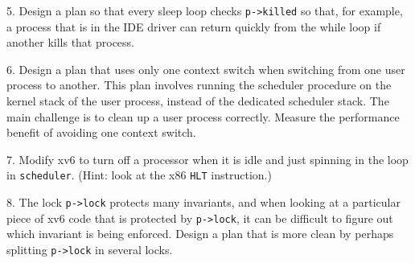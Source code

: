 5. Design a plan so that every sleep loop checks 
\lstinline{p->killed}
so that, for example, a process that is in the IDE driver can return quickly from the while loop
if another kills that process.

6. Design a plan that uses only one context switch when switching from one user
process to another.  This plan involves running the scheduler procedure on the
kernel stack of the user process, instead of the dedicated scheduler stack.  The
main challenge is to clean up a user process correctly.  Measure the performance
benefit of avoiding one context switch.

7. Modify xv6 to turn off a processor when it is idle and just spinning in the
loop in
\lstinline{scheduler}.
(Hint: look at the x86
\lstinline{HLT}
instruction.)

8. The lock
\lstinline{p->lock}
protects many invariants, and when looking at a particular piece of xv6 code that
is protected by
\lstinline{p->lock},
it can be difficult to figure out which invariant is being enforced.  Design a
plan that is more clean by perhaps splitting
\lstinline{p->lock}
in several locks.
